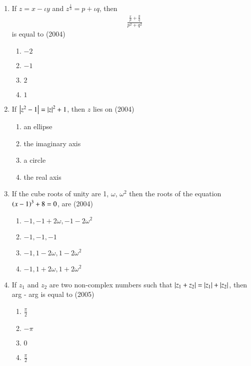 \documentclass[journal,12pt,twocolumn]{IEEEtran}
\theoremstyle{remark}
\begin{document}
\begin{enumerate}
	\item{If $z=x-\iota y$ and $z^{\frac{1}{3}}=p+\iota q$, then \begin{align*} &\frac{\frac{x}{p} + \frac{y}{q}}{p^2 + q^2} \end{align*} is equal to 
		\hfill (2004)
		\begin{multicols}{4}
		\begin{enumerate}
			\item{$-2$}
			\columnbreak
			\item{$-1$}
			\columnbreak
			\item{$2$}
			\columnbreak
			\item{$1$}
		\end{enumerate}
		\end{multicols}}

	\item{If $\left\vert z^2 - 1\right\vert = \left\vert z\right\vert^2 + 1$, then $z$ lies on \hfill (2004)
		\begin{multicols}{2}
		\begin{enumerate}
			\item{an ellipse}
			\item{the imaginary axis}
			\columnbreak
			\item{a circle}
			\item{the real axis}
		\end{enumerate}
		\end{multicols}}
	

	\item{If the cube roots of unity are 1, $\omega$, $\omega^2$ then the roots of the equation $\left(x-1\right)^3 + 8 = 0$, are \hfill (2004)
		\begin{enumerate}
			\item{$-1,-1+2\omega,-1-2\omega ^2$}
			\item{$-1,-1,-1$}
			\item{$-1, 1-2\omega, 1-2\omega ^2$}
			\item{$-1, 1+2\omega, 1+2\omega ^2$}
		\end{enumerate}}

	\item{If $z_1$ and $z_2$ are two non-complex numbers such that $\left\vert z_1 + z_2\right\vert = \left\vert z_1\right\vert + \left\vert z_2\right\vert$, then arg - arg is equal to \hfill (2005)
		\begin{multicols}{4}
		\begin{enumerate}
			\item{$\frac{\pi}{2}$}
			\columnbreak
			\item{$-\pi$}
			\columnbreak
			\item{$0$}
			\columnbreak
			\item{$\frac{\pi}{2}$}
		\end{enumerate}
		\end{multicols}}


\end{enumerate}
\end{document}
